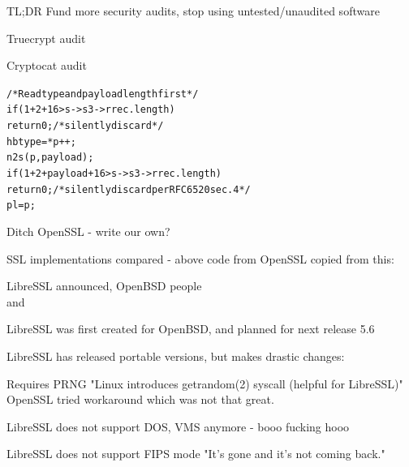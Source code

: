 \documentclass[20pt,landscape,a4paper,footrule]{foils}
\begin{document}
\vskip 2cm

\centerline{TL;DR Fund more security audits, stop using untested/unaudited software}


\begin{list1}
\item Truecrypt audit\\
{\footnotesize{}}
\item Cryptocat audit\\
{\footnotesize{}}
\end{list1}


\begin{alltt}
  /* Read type and payload length first */
    if (1 + 2 + 16 > s->s3->rrec.length)
        return 0; /* silently discard */
    hbtype = *p++;
    n2s(p, payload);
    if (1 + 2 + payload + 16 > s->s3->rrec.length)
        return 0; /* silently discard per RFC 6520 sec. 4 */
    pl = p;
\end{alltt}

\begin{list1}
\item Ditch OpenSSL - write our own?
\item SSL implementations compared - above code from OpenSSL copied from this:\\
\item LibreSSL announced, OpenBSD people\\
  and 
\end{list1}





\begin{list1}
\item LibreSSL was first created for OpenBSD, and planned for next release 5.6
\item LibreSSL has released portable versions, but makes drastic changes:
\begin{list2}
\item Requires PRNG "Linux introduces getrandom(2) syscall (helpful for LibreSSL)"\\
OpenSSL tried workaround which was not that great.
\item LibreSSL does not support DOS, VMS anymore - booo fucking hooo
\item LibreSSL does not support FIPS mode "It's gone and it's not coming back."\\
\end{list2}
\end{list1}
\end{document}
